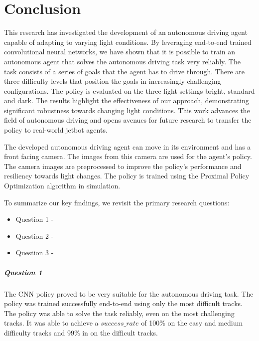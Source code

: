\chapter{Conclusion}
\label{cha:Conclusion}


This research has investigated the development of an autonomous driving agent capable of adapting to varying light conditions. By leveraging end-to-end trained convolutional neural networks, we have shown that it is possible to train an autonomous agent that solves the autonomous driving task very reliably. The task consists of a series of goals that the agent has to drive through. There are three difficulty levels that position the goals in increasingly challenging configurations. The policy is evaluated on the three light settings bright, standard and dark.
The results highlight the effectiveness of our approach, demonstrating significant robustness towards changing light conditions. This work advances the field of autonomous driving and opens avenues for future research to transfer the policy to real-world jetbot agents.

The developed autonomous driving agent can move in its environment and has a front facing camera. The images from this camera are used for the agent's policy. The camera images are preprocessed to improve the policy's performance and resiliency towards light changes. The policy is trained using the Proximal Policy Optimization algorithm in simulation.

To summarize our key findings, we revisit the primary research questions:
\begin{itemize}
    \item Question 1 - \questionOne
    \item Question 2 - \questionTwo
    \item Question 3 - \questionThree
\end{itemize}

\paragraph{Question 1}
The \acs{CNN} policy proved to be very suitable for the autonomous driving task. The policy was trained successfully end-to-end using only the most difficult tracks. The policy was able to solve the task reliably, even on the most challenging tracks. It was able to achieve a $success\_rate$ of 100\% on the easy and medium difficulty tracks and 99\% in on the difficult tracks.

